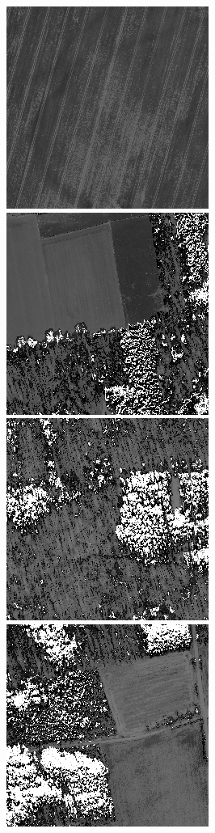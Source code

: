 \begin{figure}
    \vspace{3mm}
    \includegraphics[width=\VegetationIndicesImageWidth]{images/vegetation/evi/1} \hfill
    \includegraphics[width=\VegetationIndicesImageWidth]{images/vegetation/evi/2} \hfill
    \includegraphics[width=\VegetationIndicesImageWidth]{images/vegetation/evi/3} \hfill
    \includegraphics[width=\VegetationIndicesImageWidth]{images/vegetation/evi/4} \hfill

\end{figure}
